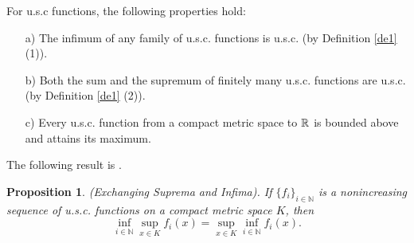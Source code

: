 \documentclass[12pt]{amsart}
\newtheorem{prop}[thm]{Proposition}
\theoremstyle{definition} \theoremstyle{question}
\numberwithin{equation}{section}
\begin{document}
For u.s.c functions, the following properties hold:
\begin{itemize}
\item[{a)}] The infimum of any family of u.s.c. functions is
u.s.c. (by Definition \ref{de1} (1)).

\item[{b)}] Both the sum and the supremum of finitely many u.s.c.
functions are u.s.c. (by  Definition \ref{de1} (2)).

\item[{c)}] Every u.s.c. function from a compact metric space to ${\Bbb R}$ is bounded
above and attains its maximum.
\end{itemize}

The following result is \cite[Proposition 2.4]{BD}.
\begin{prop} \label{esi}(Exchanging Suprema and Infima). If $\{f_i\}_{i\in \mathbb{N}}$ is a nonincreasing
sequence of u.s.c. functions on a compact metric space $K$, then
$$\inf_{i\in \mathbb{N}} \sup_{x\in K} f_i(x)= \sup_{x\in K} \inf_{i\in \mathbb{N}} f_i(x).$$
\end{prop}
\end{document}
